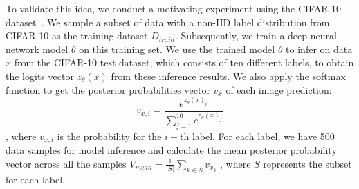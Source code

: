 To validate this idea, we conduct a motivating experiment using the CIFAR-10 dataset~\cite{krizhevsky2009learning}.
We sample a subset of data with a non-IID label distribution from CIFAR-10 as the training dataset $D_{train}$. 
Subsequently, we train a deep neural network model $\theta$ on this training set.
We use the trained model $\theta$ to infer on data $x$ from the CIFAR-10 test dataset, which consists of ten different labels, to obtain the logits vector $z_{\theta}(x)$ from these inference results. 
We also apply the softmax function to get the posterior probabilities vector $v_x$ of each image prediction:
\begin{equation}
    v_{x,i} = \frac{e^{z_\theta(x)_i}}{\sum_{j=1}^{10} e^{z_\theta(x)_j}}
\label{eq:softmax_function}
\end{equation}
, where $v_{x,i}$ is the probability for the $i-$th label.
For each label, we have 500 data samples for model inference and calculate the mean posterior probability vector across all the samples
$V_{mean} = \frac{1}{|S|} \sum_{k \in S} v_{x_k}$
, where $S$ represents the subset for each label.

